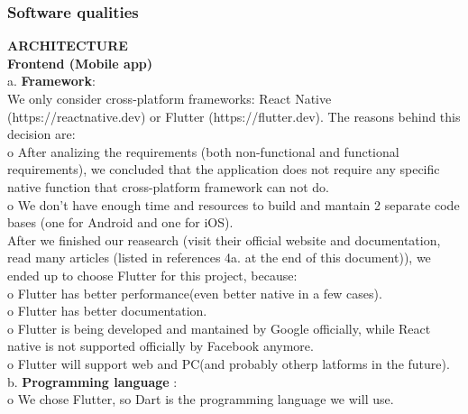 \documentclass{article}
\begin{document}
\subsubsection{Software qualities}
 \textbf{ARCHITECTURE}  \\
 \textbf{Frontend (Mobile app) } \\
a. \textbf{Framework}: \\
We only consider cross-platform frameworks: React Native (https://reactnative.dev) or Flutter (https://flutter.dev). The reasons behind this decision are: \\
o After analizing the requirements (both non-functional and functional requirements), we concluded that the application does not require any specific native function that cross-platform framework can not do.\\
o We don’t have enough time and resources to build and mantain 2 separate code bases (one for Android and one for iOS).\\
After we finished our reasearch (visit their official website and documentation, read many articles (listed in references 4a. at the end of this document)), we ended up to choose Flutter for this project, because:\\
o Flutter has better performance(even better native in a few cases).\\
o Flutter has better documentation. \\
o Flutter is being developed and mantained by Google officially, while React native is not supported officially by Facebook anymore. \\
o Flutter will support web and PC(and probably otherp latforms in the future). \\
b. \textbf{Programming language} :\\
o We chose Flutter, so Dart is the programming language we will use. \\
\end{document}
